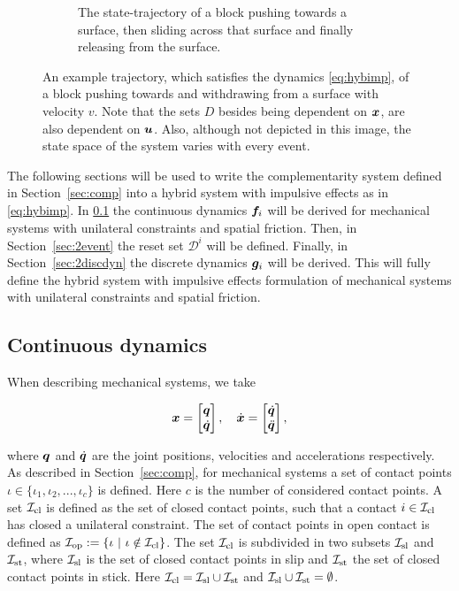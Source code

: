 \documentclass[../DC2017114Bouma.tex]{subfiles}
\begin{document}
\begin{figure}[h]
\begin{subfigure}[b]{\textwidth}
\caption{The state-trajectory of a block pushing towards a surface, then sliding across that surface and finally releasing from the surface.}
\label{fig:2exampletraj}
\end{subfigure}
\caption{An example trajectory, which satisfies the dynamics \eqref{eq:hybimp}, of a block pushing towards and withdrawing from a surface with velocity $v$.  Note that the sets $D$ besides being dependent on ${\boldsymbol{x}}$, are also dependent on ${\boldsymbol{u}}$. Also, although not depicted in this image, the state space of the system varies with every event.}
\label{fig:2example}
\end{figure}

The following sections will be used to write the complementarity system defined in Section~\ref{sec:comp} into a hybrid system with impulsive effects as in \eqref{eq:hybimp}. In \ref{sec:2contdyn} the continuous dynamics ${\boldsymbol{f}}_i$ will be derived for mechanical systems with unilateral constraints and spatial friction. Then, in Section~\ref{sec:2event} the reset set $\mathcal{D}^i$ will be defined. Finally, in Section~\ref{sec:2discdyn} the discrete dynamics ${\boldsymbol{g}}_i$ will be derived. This will fully define the hybrid system with impulsive effects formulation of mechanical systems with unilateral constraints and spatial friction.

\subsection{Continuous dynamics}\label{sec:2contdyn}
When describing mechanical systems, we take 

\begin{align}
{\boldsymbol{x}} = \begin{bmatrix}
{\boldsymbol{q}}\\ \dot{{\boldsymbol{q}}}
\end{bmatrix},\quad
\dot{{\boldsymbol{x}}} = \begin{bmatrix}
\dot{{\boldsymbol{q}}}\\ \ddot{{\boldsymbol{q}}}
\end{bmatrix},
\end{align}

where ${\boldsymbol{q}}$ and $\dot{{\boldsymbol{q}}}$ are the joint positions, velocities and accelerations respectively. As described in Section~\ref{sec:comp}, for mechanical systems a set of contact points $\iota\in\{\iota_1,\iota_2,...,\iota_c\}$ is defined. Here $c$ is the number of considered contact points. A set $\mathcal{I}_{\text{cl}}$ is defined as the set of closed contact points, such that a contact $i\in\mathcal{I}_{\text{cl}}$ has closed a unilateral constraint. The set of contact points in open contact is defined as $\Ic_{\text{op}} := \{\iota\ |\ \iota\notin\Ic_{\text{cl}}\}$. The set $\mathcal{I}_{\text{cl}}$ is subdivided in two subsets $\mathcal{I}_{\text{sl}}$ and $\mathcal{I}_{\text{st}}$, where $\mathcal{I}_{\text{sl}}$ is the set of closed contact points in slip and $\mathcal{I}_{\text{st}}$ the set of closed contact points in stick. Here $\mathcal{I}_{\text{cl}} =\mathcal{I}_{\text{sl}}\cup\mathcal{I}_{\text{st}}$ and $\mathcal{I}_{\text{sl}}\cup\mathcal{I}_{\text{st}}=\emptyset$. 
\end{document}
